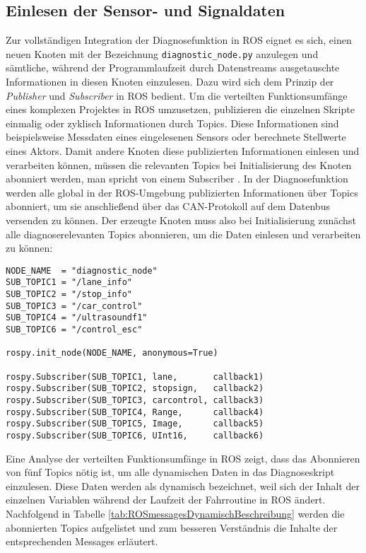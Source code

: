 \subsection{Einlesen der Sensor- und Signaldaten} \label{subsec:EinlesenDatenInROS}

Zur vollständigen Integration der Diagnosefunktion in ROS eignet es sich, einen neuen Knoten mit der Bezeichnung \texttt{diagnostic\_node.py} anzulegen und sämtliche, während der Programmlaufzeit durch Datenstreams ausgetauschte Informationen in diesen Knoten einzulesen. Dazu wird sich dem Prinzip der \emph{Publisher} und \emph{Subscriber} in ROS bedient. Um die verteilten Funktionsumfänge eines komplexen Projektes in ROS umzusetzen, publizieren die einzelnen Skripte einmalig oder zyklisch Informationen durch Topics. Diese Informationen sind beispielsweise Messdaten eines eingelesenen Sensors oder berechnete Stellwerte eines Aktors. Damit andere Knoten diese publizierten Informationen einlesen und verarbeiten können, müssen die relevanten Topics bei Initialisierung des Knoten abonniert werden, man spricht von einem Subscriber \cite{Quigley.2015}. In der Diagnosefunktion werden alle global in der ROS-Umgebung publizierten Informationen über Topics abonniert, um sie anschließend über das CAN-Protokoll auf dem Datenbus versenden zu können. Der erzeugte Knoten muss also bei Initialisierung zunächst alle diagnoserelevanten Topics abonnieren, um die Daten einlesen und verarbeiten zu können: 

\begin{addmargin}[1cm]{0cm} 
	\begin{verbatim}
NODE_NAME  = "diagnostic_node"
SUB_TOPIC1 = "/lane_info"
SUB_TOPIC2 = "/stop_info"
SUB_TOPIC3 = "/car_control"
SUB_TOPIC4 = "/ultrasoundf1"
SUB_TOPIC6 = "/control_esc"

rospy.init_node(NODE_NAME, anonymous=True)

rospy.Subscriber(SUB_TOPIC1, lane,       callback1)
rospy.Subscriber(SUB_TOPIC2, stopsign,   callback2)
rospy.Subscriber(SUB_TOPIC3, carcontrol, callback3)
rospy.Subscriber(SUB_TOPIC4, Range,      callback4)
rospy.Subscriber(SUB_TOPIC5, Image,      callback5)
rospy.Subscriber(SUB_TOPIC6, UInt16,     callback6)
	\end{verbatim}
\end{addmargin}

Eine Analyse der verteilten Funktionsumfänge in ROS zeigt, dass das Abonnieren von fünf Topics nötig ist, um alle dynamischen Daten in das Diagnoseskript einzulesen. Diese Daten werden als dynamisch bezeichnet, weil sich der Inhalt der einzelnen Variablen während der Laufzeit der Fahrroutine in ROS ändert.
Nachfolgend in Tabelle \ref{tab:ROSmessagesDynamischBeschreibung} werden die abonnierten Topics  aufgelistet und zum besseren Verständnis die Inhalte der entsprechenden Messages erläutert. 

